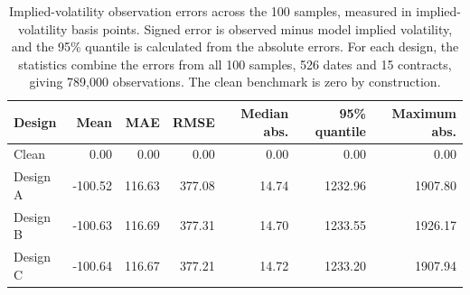 \begin{table}[H]
\centering
\small
\setlength{\tabcolsep}{5pt}
\begin{tabular}{lrrrrrr}
\toprule
Design & Mean & MAE & RMSE & Median abs. & 95\% quantile & Maximum abs. \\
\midrule
Clean & 0.00 & 0.00 & 0.00 & 0.00 & 0.00 & 0.00 \\
Design A & -100.52 & 116.63 & 377.08 & 14.74 & 1232.96 & 1907.80 \\
Design B & -100.63 & 116.69 & 377.31 & 14.70 & 1233.55 & 1926.17 \\
Design C & -100.64 & 116.67 & 377.21 & 14.72 & 1233.20 & 1907.94 \\
\bottomrule
\end{tabular}
\caption{Implied-volatility observation errors across the 100 samples, measured in implied-volatility basis points. Signed error is observed minus model implied volatility, and the 95\% quantile is calculated from the absolute errors. For each design, the statistics combine the errors from all 100 samples, 526 dates and 15 contracts, giving 789,000 observations. The clean benchmark is zero by construction.}
\label{tab:mc_noise_summary}
\end{table}

